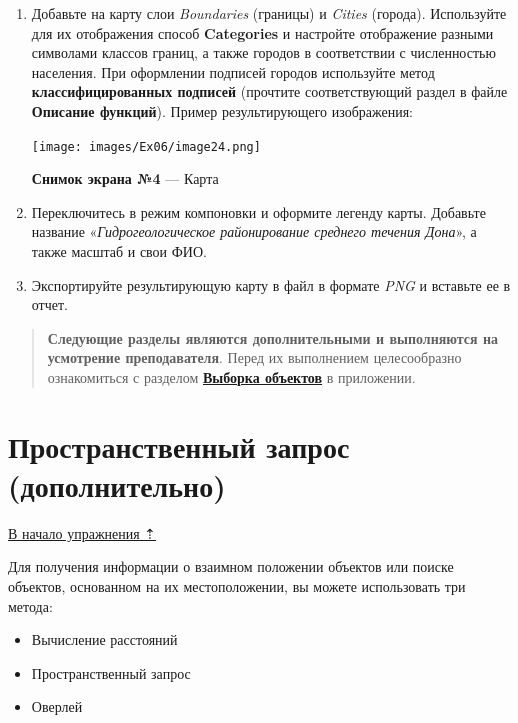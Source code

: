 \documentclass[12pt,]{book}
\providecommand{\tightlist}{%
  \setlength{\itemsep}{0pt}\setlength{\parskip}{0pt}}
\begin{document}
\begin{enumerate}
\def\labelenumi{\arabic{enumi}.}
\item
  Добавьте на карту слои \emph{Boundaries} (границы) и \emph{Cities} (города). Используйте для их отображения способ \textbf{Categories} и настройте отображение разными символами классов границ, а также городов в соответствии с численностью населения. При оформлении подписей городов используйте метод \textbf{классифицированных подписей} (прочтите соответствующий раздел в файле \textbf{Описание функций}). Пример результирующего изображения:

  \texttt{[image: images/Ex06/image24.png]}

  \textbf{Снимок экрана №4} --- Карта
\item
  Переключитесь в режим компоновки и оформите легенду карты. Добавьте название «\emph{Гидрогеологическое районирование среднего течения Дона}», а также масштаб и свои ФИО.
\item
  Экспортируйте результирующую карту в файл в формате \emph{PNG} и вставьте ее в отчет.
\end{enumerate}

\begin{quote}
\textbf{Следующие разделы являются дополнительными и выполняются на усмотрение преподавателя}. Перед их выполнением целесообразно ознакомиться с разделом \textbf{\protect\hyperlink{manual-select}{Выборка объектов}} в приложении.
\end{quote}

\hypertarget{map-ref-hydrogeologic-query}{%
\section{Пространственный запрос (дополнительно)}\label{map-ref-hydrogeologic-query}}

\protect\hyperlink{map-ref-hydrogeologic}{В начало упражнения ⇡}

Для получения информации о взаимном положении объектов или поиске объектов, основанном на их местоположении, вы можете использовать три метода:

\begin{itemize}
\tightlist
\item
  Вычисление расстояний
\item
  Пространственный запрос
\item
  Оверлей
\end{itemize}
\end{document}
